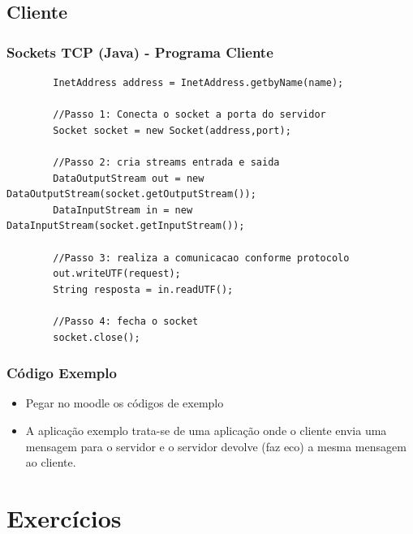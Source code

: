 \documentclass[hyperref={pdfpagelabels=false},table]{beamer}
\begin{document}
\subsection{Cliente}
\begin{frame}[fragile]
	\frametitle{Sockets TCP (Java) - Programa Cliente}

	\begin{lstlisting}
		InetAddress address = InetAddress.getbyName(name);

		//Passo 1: Conecta o socket a porta do servidor
		Socket socket = new Socket(address,port);
            
		//Passo 2: cria streams entrada e saida
		DataOutputStream out = new DataOutputStream(socket.getOutputStream());
		DataInputStream in = new DataInputStream(socket.getInputStream());

		//Passo 3: realiza a comunicacao conforme protocolo
		out.writeUTF(request);
		String resposta = in.readUTF();

		//Passo 4: fecha o socket
		socket.close();
	\end{lstlisting} 
\end{frame}


\begin{frame}[fragile]
	\frametitle{Código Exemplo}
	\begin{itemize}   
	 \item Pegar no moodle os códigos de exemplo
	 \item A aplicação exemplo trata-se de uma aplicação onde o cliente envia uma mensagem para o servidor e o servidor devolve (faz eco) a mesma mensagem ao  cliente.
	\end{itemize}
\end{frame}


\section{Exercícios}

\end{document}

